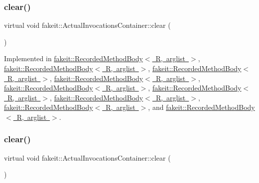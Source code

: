 \subsubsection{\texorpdfstring{clear()}{clear()}\hspace{0.1cm}{\footnotesize\ttfamily [3/9]}}
{\footnotesize\ttfamily virtual void fakeit\+::\+Actual\+Invocations\+Container\+::clear (\begin{DoxyParamCaption}{ }\end{DoxyParamCaption})\hspace{0.3cm}{\ttfamily [pure virtual]}}



Implemented in \mbox{\hyperlink{classfakeit_1_1RecordedMethodBody_a6164a16c7813da2b7cd0d46568f1f1bc}{fakeit\+::\+Recorded\+Method\+Body$<$ R, arglist $>$}}, \mbox{\hyperlink{classfakeit_1_1RecordedMethodBody_a6164a16c7813da2b7cd0d46568f1f1bc}{fakeit\+::\+Recorded\+Method\+Body$<$ R, arglist $>$}}, \mbox{\hyperlink{classfakeit_1_1RecordedMethodBody_a6164a16c7813da2b7cd0d46568f1f1bc}{fakeit\+::\+Recorded\+Method\+Body$<$ R, arglist $>$}}, \mbox{\hyperlink{classfakeit_1_1RecordedMethodBody_a6164a16c7813da2b7cd0d46568f1f1bc}{fakeit\+::\+Recorded\+Method\+Body$<$ R, arglist $>$}}, \mbox{\hyperlink{classfakeit_1_1RecordedMethodBody_a6164a16c7813da2b7cd0d46568f1f1bc}{fakeit\+::\+Recorded\+Method\+Body$<$ R, arglist $>$}}, \mbox{\hyperlink{classfakeit_1_1RecordedMethodBody_a6164a16c7813da2b7cd0d46568f1f1bc}{fakeit\+::\+Recorded\+Method\+Body$<$ R, arglist $>$}}, \mbox{\hyperlink{classfakeit_1_1RecordedMethodBody_a6164a16c7813da2b7cd0d46568f1f1bc}{fakeit\+::\+Recorded\+Method\+Body$<$ R, arglist $>$}}, \mbox{\hyperlink{classfakeit_1_1RecordedMethodBody_a6164a16c7813da2b7cd0d46568f1f1bc}{fakeit\+::\+Recorded\+Method\+Body$<$ R, arglist $>$}}, and \mbox{\hyperlink{classfakeit_1_1RecordedMethodBody_a6164a16c7813da2b7cd0d46568f1f1bc}{fakeit\+::\+Recorded\+Method\+Body$<$ R, arglist $>$}}.

\mbox{\label{structfakeit_1_1ActualInvocationsContainer_ab0af1e59028b53f8258b713f89bfdcbe}} 
\subsubsection{\texorpdfstring{clear()}{clear()}\hspace{0.1cm}{\footnotesize\ttfamily [4/9]}}
{\footnotesize\ttfamily virtual void fakeit\+::\+Actual\+Invocations\+Container\+::clear (\begin{DoxyParamCaption}{ }\end{DoxyParamCaption})\hspace{0.3cm}{\ttfamily [pure virtual]}}



